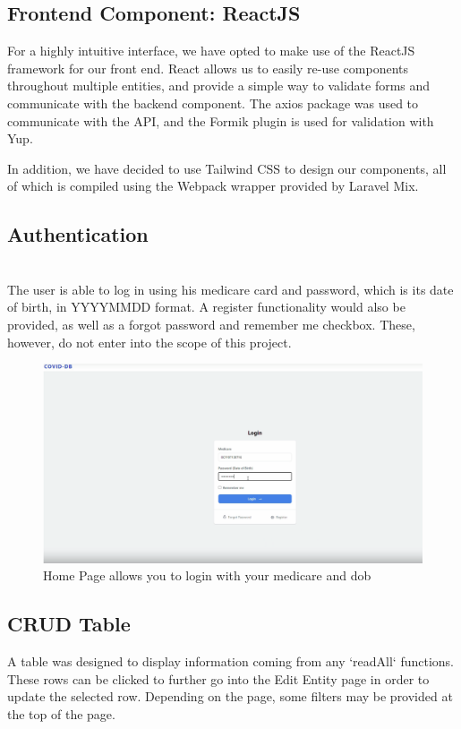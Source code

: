 \subsection{Frontend Component: ReactJS}

For a highly intuitive interface, we have opted to make use of the ReactJS framework for our front end. React allows us to easily re-use components throughout multiple entities, and provide a simple way to validate forms and communicate with the backend component. The axios package was used to communicate with the API, and the Formik plugin is used for validation with Yup. 

In addition, we have decided to use Tailwind CSS to design our components, all of which is compiled using the Webpack wrapper provided by Laravel Mix.


\subsection{Authentication}
\\
The user is able to log in using his medicare card and password, which is its date of birth, in YYYYMMDD format. A register functionality would also be provided, as well as a forgot password and remember me checkbox. These, however, do not enter into the scope of this project.

\begin{figure}[H]
    \centering
    \includegraphics[scale=0.35]{imgs/loginScreen.PNG}
    \caption{Home Page allows you to login with your medicare and dob}
\end{figure}

\subsection{CRUD Table}

A table was designed to display information coming from any `readAll` functions. These rows can be clicked to further go into the Edit Entity page in order to update the selected row. Depending on the page, some filters may be provided at the top of the page.

